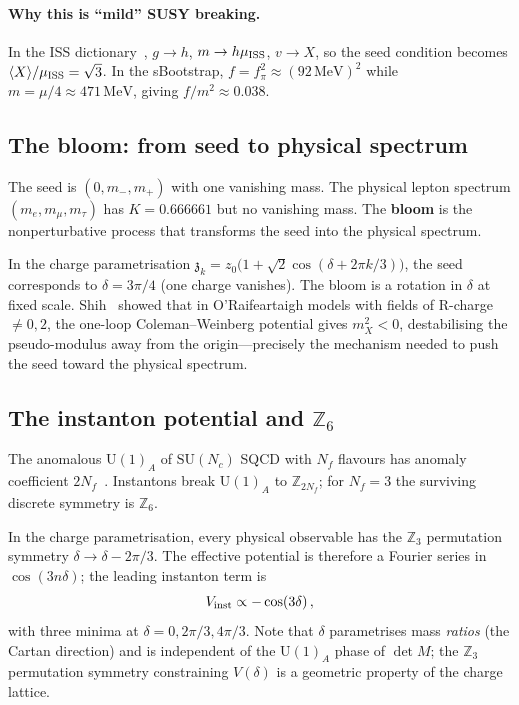 \documentclass[12pt,a4paper]{article}
\newcommand{\SU}{\mathrm{SU}}
\newcommand{\UU}{\mathrm{U}}
\newcommand{\Nf}{N_{\!f}}
\newcommand{\Nc}{N_{\!c}}
\newcommand{\MeV}{\,\mathrm{MeV}}
\newcommand{\zch}{\mathfrak{z}}
\begin{document}
\paragraph{Why this is ``mild'' SUSY breaking.}
In the ISS dictionary~\cite{ISS:2006}, $g \to h$,
$m \to h\mu_{\rm ISS}$, $v \to X$, so the seed condition becomes
$\langle X\rangle/\mu_{\rm ISS} = \sqrt{3}$.
In the sBootstrap, $f = f_\pi^2 \approx (92\MeV)^2$ while
$m = \mu/4 \approx 471\MeV$, giving $f/m^2 \approx 0.038$.


\subsection{The bloom: from seed to physical spectrum}

The seed is $(0, m_-, m_+)$ with one vanishing mass.
The physical lepton spectrum $(m_e, m_\mu, m_\tau)$ has
$K = 0.666661$ but no vanishing mass.
The \textbf{bloom} is the nonperturbative process that transforms
the seed into the physical spectrum.

In the charge parametrisation
$\zch_k = z_0\bigl(1 + \sqrt{2}\cos(\delta + 2\pi k/3)\bigr)$,
the seed corresponds to $\delta = 3\pi/4$ (one charge vanishes).
The bloom is a rotation in $\delta$ at fixed scale.
Shih~\cite{Shih:2008} showed that in O'Raifeartaigh models with
fields of R-charge $\neq 0, 2$, the one-loop Coleman--Weinberg
potential gives $m_X^2 < 0$, destabilising the pseudo-modulus
away from the origin---precisely the mechanism needed to push the
seed toward the physical spectrum.


\subsection{The instanton potential and $\mathbb{Z}_6$}

The anomalous $\UU(1)_A$ of $\SU(\Nc)$ SQCD with $\Nf$ flavours
has anomaly coefficient $2\Nf$~\cite{Seiberg:1994bz,Tong:SUSY}.
Instantons break $\UU(1)_A$ to $\mathbb{Z}_{2\Nf}$;
for $\Nf = 3$ the surviving discrete symmetry is $\mathbb{Z}_6$.

In the charge parametrisation, every physical observable has the
$\mathbb{Z}_3$ permutation symmetry
$\delta \to \delta - 2\pi/3$.
The effective potential is therefore a Fourier series in
$\cos(3n\delta)$; the leading instanton term is
\begin{equation}
  V_{\rm inst} \propto -\cos(3\delta)\,,
  \label{eq:cos3delta}
\end{equation}
with three minima at $\delta = 0, 2\pi/3, 4\pi/3$.
Note that $\delta$ parametrises mass \emph{ratios} (the Cartan
direction) and is independent of the $\UU(1)_A$ phase of
$\det M$; the $\mathbb{Z}_3$ permutation symmetry constraining
$V(\delta)$ is a geometric property of the charge lattice.
\end{document}

